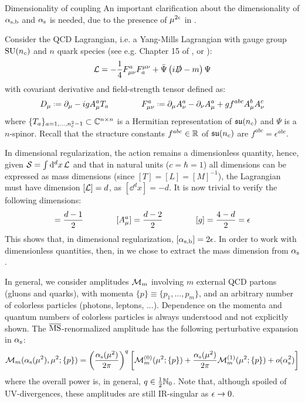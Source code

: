 \begin{observation}{Dimensionality of coupling}{}
  An important clarification about the dimensionality of $ \alpha_\text{s,b} $ and $ \alpha_\text{s} $ is needed, due to the presence of $ \mu^{2\epsilon} $ in .

  Consider the QCD Lagrangian, i.e. a Yang-Mills Lagrangian with gauge group $ \mathrm{SU}(n_c) $ and $ n $ quark species (see e.g. Chapter 15 of \cite{Weinberg-1996}, or ):
  \begin{equation}
    \mathcal{L} = - \frac{1}{4} F_{\mu \nu}^a F^{\mu \nu}_a + \bar{\Psi} \left( i \slashed{D} - m \right) \Psi
  \end{equation}
  with covariant derivative and field-strength tensor defined as:
  \begin{equation}
    D_\mu \defeq \pa_\mu - i g A_\mu^a T_a
    \qquad \qquad
    F_{\mu \nu}^a \defeq \pa_\mu A_\nu^a - \pa_\nu A_\mu^a + g f^{abc} A_\mu^b A_\nu^c
    \label{eq:cov-der-field-str}
  \end{equation}
  where $ \{T_a\}_{a = 1, \dots, n_c^2 - 1} \subset \mathbb{C}^{n \times n} $ is a Hermitian representation of $ \mathfrak{su}(n_c) $ and $ \Psi $ is a $ n $-spinor. Recall that the structure constants $ f^{abc} \in \mathbb{R} $ of $ \mathfrak{su}(n_c) $ are $ f^{abc} = \epsilon^{abc} $.

  In dimensional regularization, the action remains a dimensionless quantity, hence, given $ \mathcal{S} = \int \mathrm{d}^dx \, \mathcal{L} $ and that in natural units ($ c = \hbar = 1 $) all dimensions can be expressed as mass dimensions (since $ [T] = [L] = [M]^{-1} $), the Lagrangian must have dimension $ [\mathcal{L}] = d $, as $ [\dd^dx] = -d $. It is now trivial to verify the following dimensions:
  \begin{equation*}
    [\Psi] = \frac{d - 1}{2}
    \qquad \qquad
    [A_\mu^a] = \frac{d - 2}{2}
    \qquad \qquad
    [g] = \frac{4 - d}{2} = \de
  \end{equation*}
  This shows that, in dimensional regularization, $ [\alpha_\text{s,b}] = 2\epsilon $. In order to work with dimensionless quantities, then, in  we chose to extract the mass dimension from $ \alpha_\text{s} $.
\end{observation}

In general, we consider amplitudes $ \mathcal{M}_m $ involving $ m $ external QCD partons (gluons and quarks), with momenta $ \{p\} \equiv \{p_1, \dots, p_m\} $, and an arbitrary number of colorless particles (photons, leptons, ...). Dependence on the momenta and quantum numbers of colorless particles is always understood and not explicitly shown. The $ \overline{\text{MS}} $-renormalized amplitude has the following perturbative expansion in $ \alpha_\text{s} $:
\begin{equation}
  \mathcal{M}_m(\alpha_\text{s}(\mu^2), \mu^2 ; \{p\}) = \left( \frac{\alpha_\text{s}(\mu^2)}{2\pi} \right)^q \left[ \mathcal{M}_m^{(0)}(\mu^2 ; \{p\}) + \frac{\alpha_\text{s}(\mu^2)}{2\pi} \mathcal{M}_m^{(1)}(\mu^2 ; \{p\}) + o(\alpha_\text{s}^2) \right]
  \label{eq:mat-exp}
\end{equation}
where the overall power is, in general, $ q \in \frac{1}{2} \mathbb{N}_0 $. Note that, although spoiled of UV-divergences, these amplitudes are still IR-singular as $ \epsilon \rightarrow 0 $.

